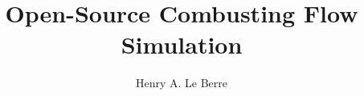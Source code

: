 \documentclass[12pt]{gatechthesis}
\title{Open-Source Combusting Flow Simulation}
\author{Henry A. Le Berre}
\begin{document}



\begin{thesisbody}
  \begin{multicols}{2}
    
    
    
    
    
    
    
    \vfill\null
    \makeBibliography
  \end{multicols}
\end{thesisbody}
\end{document}
